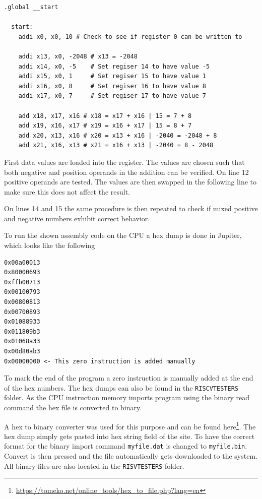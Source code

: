         \begin{lstlisting}[language={[Sharp]C}]
.global __start

__start:
    addi x0, x0, 10 # Check to see if register 0 can be written to
    
    addi x13, x0, -2048 # x13 = -2048
    addi x14, x0, -5    # Set regiser 14 to have value -5
    addi x15, x0, 1     # Set regiser 15 to have value 1
    addi x16, x0, 8     # Set regiser 16 to have value 8
    addi x17, x0, 7     # Set regiser 17 to have value 7
    
    add x18, x17, x16 # x18 = x17 + x16 | 15 = 7 + 8
    add x19, x16, x17 # x19 = x16 + x17 | 15 = 8 + 7
    add x20, x13, x16 # x20 = x13 + x16 | -2040 = -2048 + 8
    add x21, x16, x13 # x21 = x16 + x13 | -2040 = 8 - 2048
        \end{lstlisting}

    
    First data values are loaded into the register. The values are chosen such that both negative and position operands in the addition can be verified. On line 12 positive operands are tested. The values are then swapped in the following line to make sure this does not affect the result.
    
    On lines 14 and 15 the same procedure is then repeated to check if mixed positive and negative numbers exhibit correct behavior.
    
    To run the shown assembly code on the CPU a hex dump is done in Jupiter, which looks like the following
    

        \begin{lstlisting}[language={[Sharp]C}]
0x00a00013
0x80000693
0xffb00713
0x00100793
0x00800813
0x00700893
0x01088933
0x011809b3
0x01068a33
0x00d80ab3
0x00000000 <- This zero instruction is added manually  
        \end{lstlisting}

    To mark the end of the program a zero instruction is manually added at the end of the hex numbers. The hex dumps can also be found in the \texttt{RISCVTESTERS} folder. As the CPU instruction memory imports program using the binary read command the hex file is converted to binary.
    
    A hex to binary converter was used for this purpose and can be found here\footnote{\url{https://tomeko.net/online_tools/hex_to_file.php?lang=en}}. The hex dump simply gets pasted into hex string field of the site. To have the correct format for the binary import command \texttt{myfile.dat} is changed to \texttt{myfile.bin}. Convert is then pressed and the file automatically gets downloaded to the system. All binary files are also located in the \texttt{RISVTESTERS} folder.
    
